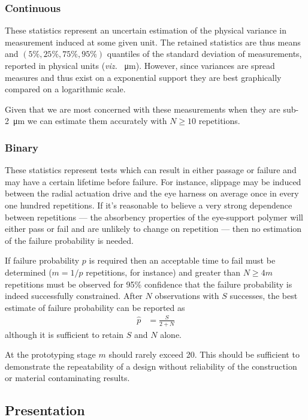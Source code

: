 \documentclass{article}
\begin{document}
\subsubsection{Continuous}
\label{sec:continuous}

These statistics represent an uncertain estimation of the physical variance in measurement induced at some given unit. The retained statistics are thus means and $(5\%, 25\%, 75\%, 95\%)$ quantiles of the standard deviation of measurements, reported in physical units (\textit{viz.} \SI{}{\micro m}). However, since variances are spread measures and thus exist on a exponential support they are best graphically compared on a logarithmic scale.

Given that we are most concerned with these measurements when they are sub-\SI{2}{\micro m} we can estimate them accurately with $N \ge 10$ repetitions.

\subsubsection{Binary}
\label{sec:binary}

These statistics represent tests which can result in either passage or failure and may have a certain lifetime before failure. For instance, slippage may be induced between the radial actuation drive and the eye harness on average once in every one hundred repetitions. If it's reasonable to believe a very strong dependence between repetitions --- the absorbency properties of the eye-support polymer will either pass or fail and are unlikely to change on repetition --- then no estimation of the failure probability is needed.

If failure probability $p$ is required then an acceptable time to fail must be determined ($m = 1/p$ repetitions, for instance) and greater than $N \ge 4m$ repetitions must be observed for 95\% confidence that the failure probability is indeed successfully constrained. After $N$ observations with $S$ successes, the best estimate of failure probability can be reported as
\begin{align}
  \hat{p} &= \frac{S}{2 + N}
\end{align}
although it is sufficient to retain $S$ and $N$ alone.

At the prototyping stage $m$ should rarely exceed 20. This should be sufficient to demonstrate the repeatability of a design without reliability of the construction or material contaminating results.

\subsection{Presentation}
\label{sec:presentation}
\end{document}
